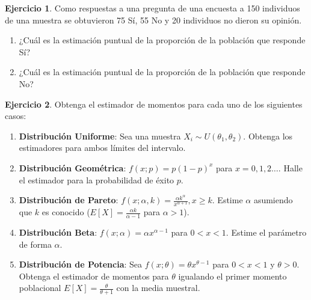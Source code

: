 \documentclass[
  11pt,
]{book}
\theoremstyle{definition}
\theoremstyle{definition}
\theoremstyle{definition}
\newtheorem{exercise}{Ejercicio}[chapter]
\theoremstyle{definition}
\theoremstyle{remark}
\begin{document}
\begin{exercise}

Como respuestas a una pregunta de una encuesta a 150 individuos de una muestra se obtuvieron 75 Sí, 55 No y 20 individuos no dieron su opinión.

\begin{enumerate}
\def\labelenumi{\alph{enumi}.}
\item
  ¿Cuál es la estimación puntual de la proporción de la población que responde Sí?
\item
  ¿Cuál es la estimación puntual de la proporción de la población que responde No?
\end{enumerate}

\end{exercise}

\begin{exercise}

Obtenga el estimador de momentos para cada uno de los siguientes casos:

\begin{enumerate}
\def\labelenumi{\arabic{enumi}.}
\item
  \textbf{Distribución Uniforme}: Sea una muestra \(X_i \sim U(\theta_1, \theta_2)\). Obtenga los estimadores para ambos límites del intervalo.
\item
  \textbf{Distribución Geométrica}: \(f(x; p) = p(1-p)^x\) para \(x=0,1,2\dots\). Halle el estimador para la probabilidad de éxito \(p\).
\item
  \textbf{Distribución de Pareto}: \(f(x; \alpha, k) = \frac{\alpha k^\alpha}{x^{\alpha+1}}, x \geq k\). Estime \(\alpha\) asumiendo que \(k\) es conocido (\(E[X] = \frac{\alpha k}{\alpha-1}\) para \(\alpha > 1\)).
\item
  \textbf{Distribución Beta}: \(f(x; \alpha) = \alpha x^{\alpha-1}\) para \(0 < x < 1\). Estime el parámetro de forma \(\alpha\).
\item
  \textbf{Distribución de Potencia}: Sea \(f(x; \theta) = \theta x^{\theta-1}\) para \(0 < x < 1\) y \(\theta > 0\). Obtenga el estimador de momentos para \(\theta\) igualando el primer momento poblacional \(E[X] = \frac{\theta}{\theta+1}\) con la media muestral.
\end{enumerate}

\end{exercise}
\end{document}
